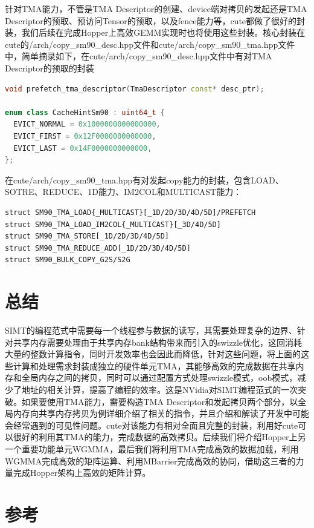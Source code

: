 针对TMA能力，不管是TMA Descriptor的创建、device端对拷贝的发起还是TMA Descriptor的预取、预访问Tensor的预取，以及fence能力等，cute都做了很好的封装，我们后续在完成Hopper上高效GEMM实现时也将使用这些封装。核心封装在cute的/arch/copy\_sm90\_desc.hpp文件和cute/arch/copy\_sm90\_tma.hpp文件中，简单摘录如下，在cute/arch/copy\_sm90\_desc.hpp文件中有对TMA Descriptor的预取的封装

\begin{lstlisting}[language=C++]
void prefetch_tma_descriptor(TmaDescriptor const* desc_ptr);

enum class CacheHintSm90 : uint64_t {
  EVICT_NORMAL = 0x1000000000000000,
  EVICT_FIRST = 0x12F0000000000000,
  EVICT_LAST = 0x14F0000000000000,
};
\end{lstlisting}

在cute/arch/copy\_sm90\_tma.hpp有对发起copy能力的封装，包含LOAD、SOTRE、REDUCE、1D能力、IM2COL和MULTICAST能力：

\begin{lstlisting}
struct SM90_TMA_LOAD{_MULTICAST}[_1D/2D/3D/4D/5D]/PREFETCH
struct SM90_TMA_LOAD_IM2COL{_MULTICAST}[_3D/4D/5D]
struct SM90_TMA_STORE[_1D/2D/3D/4D/5D]
struct SM90_TMA_REDUCE_ADD[_1D/2D/3D/4D/5D]
struct SM90_BULK_COPY_G2S/S2G
\end{lstlisting}

\section{总结}

SIMT的编程范式中需要每一个线程参与数据的读写，其需要处理复杂的边界、针对共享内存需要处理由于共享内存bank结构带来而引入的swizzle优化，这回消耗大量的整数计算指令，同时开发效率也会因此而降低，针对这些问题，将上面的这些计算和处理需求封装成独立的硬件单元TMA，其能够高效的完成数据在共享内存和全局内存之间的拷贝，同时可以通过配置方式处理swizzle模式，oob模式，减少了地址的相关计算，提高了编程的效率。这是NVidia对SIMT编程范式的一次突破。如果要使用TMA能力，需要构造TMA Descriptor和发起拷贝两个部分，以全局内存向共享内存拷贝为例详细介绍了相关的指令，并且介绍和解读了开发中可能会经常遇到的可见性问题。cute对该能力有相对全面且完整的封装，利用好cute可以很好的利用其TMA的能力，完成数据的高效拷贝。后续我们将介绍Hopper上另一个重要功能单元WGMMA，最后我们将利用TMA完成高效的数据加载，利用WGMMA完成高效的矩阵运算、利用MBarrier完成高效的协同，借助这三者的力量完成Hopper架构上高效的矩阵计算。

\section{参考}

